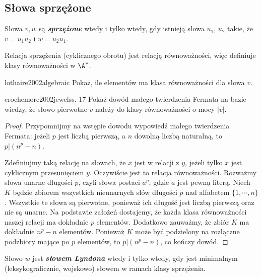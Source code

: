 \subsection{Słowa sprzężone}

\begin{definition}{}{}
  Słowa $v, w$ są \textbf{\textit{sprzężone}} wtedy i tylko wtedy, gdy istnieją słowa $u_1$, $u_2$ takie, że $v = u_1 u_2$ i $w = u_2 u_1$.
\end{definition}

\begin{corollary}{}{}
  Relacja sprzężenia (cyklicznego obrotu) jest relacją równoważności, więc definiuje klasy równoważności w $\A^*$.
\end{corollary}

\begin{problem}{lothaire2002algebraic}{}
  Pokaż, ile elementów ma klasa równoważności dla słowa $v$.
\end{problem}

\begin{problem}{crochemore2002jewels}{s. 17}
  Pokaż dowód małego twierdzenia Fermata na bazie wiedzy, że słowo pierwotne $v$ należy do klasy równoważności o mocy $|v|$.
\end{problem}

\begin{proof}
Przypomnijmy na wstępie dowodu wypowiedź małego twierdzenia Fermata: jeżeli $p$ jest liczbą pierwszą, a $n$ dowolną liczbą naturalną, to $p | (n^p-n)$.

Zdefiniujmy taką relację na słowach, że $x$ jest w relacji z $y$, jeżeli tylko $x$ jest cyklicznym przesunięciem $y$. Oczywiście jest to relacja równoważności. Rozważmy słowa unarne długości $p$, czyli słowa postaci $a^p$, gdzie $a$ jest pewną literą. Niech $K$ będzie zbiorem wszystkich nieunarnych słów długości $p$ nad alfabetem $\{1,\cdots,n\}$. Wszystkie te słowa są pierwotne, ponieważ ich długość jest liczbą pierwszą oraz nie są unarne. Na podstawie założeń dostajemy, że każda klasa równoważności naszej relacji ma dokładnie $p$ elementów. Dodatkowo zauważmy, że zbiór $K$ ma dokładnie $n^p-n$ elementów. Ponieważ $K$ może być podzielony na rozłączne podzbiory mające po $p$ elementów, to $p|(n^p-n)$, co kończy dowód.
\end{proof}

\begin{definition}{}{}
  Słowo $w$ jest \textbf{\textit{słowem Lyndona}} wtedy i tylko wtedy, gdy jest minimalnym (leksykograficznie, wojskowo) słowem w ramach klasy sprzężenia.
\end{definition}
